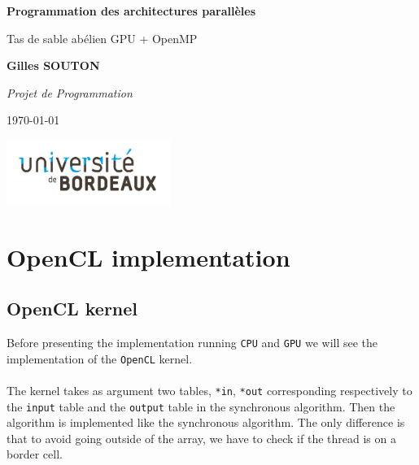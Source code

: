 \documentclass{report}
\def\openCL{\texttt{OpenCL}}
\def\CPU{\texttt{CPU}}
\def\GPU{\texttt{GPU}}
\newcommand{\code}[1]{\texttt{#1}}
\begin{document}
\begin{titlepage}
	\begin{center}
		\vspace*{1cm}

		\Huge
		\textbf{Programmation des architectures parallèles}

		\vspace{1cm}
		\LARGE
		Tas de sable abélien GPU + OpenMP

		\vspace{1.5cm}

		\textbf{
			Gilles SOUTON\\
		}

		\vspace{7cm}

		\textit{Projet de Programmation}

		\vspace{0.8cm}

		\Large
		\today

		\vfill

		\includegraphics[width=0.4\textwidth]{img/Universite Bordeaux RVB-01.jpg}
	\end{center}
\end{titlepage}


\chapter{OpenCL implementation}
\section{OpenCL kernel}
Before presenting the implementation running \CPU{} and \GPU{} we will see the implementation
of the \openCL{} kernel.\\\\
The kernel takes as argument two tables, \code{*in}, \code{*out} corresponding respectively
to the \texttt{input} table and the \texttt{output} table in the synchronous algorithm.
Then the algorithm is implemented like the synchronous algorithm.
The only difference is that to avoid going outside of the array, we have to
check if the thread is on a border cell.
\end{document}
